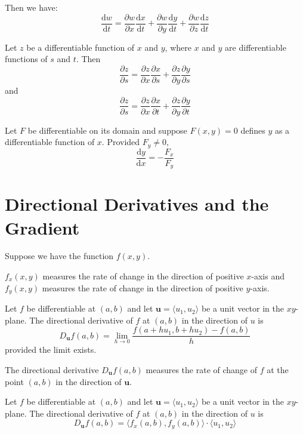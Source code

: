 \documentclass[../calc3.tex]{subfiles}
\begin{document}
Then we have:
\[\frac{\mathrm{d}w}{\mathrm{d}t}=\frac{\partial w}{\partial x}\frac{\mathrm{d}x}{\mathrm{d}t}+\frac{\partial w}{\partial y}\frac{\mathrm{d}y}{\mathrm{d}t}+\frac{\partial w}{\partial z}\frac{\mathrm{d}z}{\mathrm{d}t}\]

\begin{theorem}
    Let $z$ be a differentiable function of $x$ and $y$, where $x$ and $y$ are differentiable functions of $s$ and $t$. Then
    \[\frac{\partial z}{\partial s}=\frac{\partial z}{\partial x}\frac{\partial x}{\partial s}+\frac{\partial z}{\partial y}\frac{\partial y}{\partial s}\]
    and
    \[\frac{\partial z}{\partial s}=\frac{\partial z}{\partial x}\frac{\partial x}{\partial t}+\frac{\partial z}{\partial y}\frac{\partial y}{\partial t}\]
\end{theorem}

\begin{theorem}
    Let $F$ be differentiable on its domain and suppose $F(x,y) = 0$ defines $y$ as a 
    differentiable function of $x$. Provided $F_y\neq 0$,
    \[\frac{\mathrm{d}y}{\mathrm{d}x}=-\frac{F_x}{F_y}\]
\end{theorem}

\section{Directional Derivatives and the Gradient}
Suppose we have the function $f(x,y)$.

$f_x(x,y)$ measures the rate of change in the direction of positive $x$-axis and 
$f_y(x,y)$ measures the rate of change in the direction of positive $y$-axis.

\begin{definition}
    Let $f$ be differentiable at $(a,b)$ and let $\textbf{u}=\langle u_1, u_2\rangle$ be a unit vector 
    in the $xy$-plane. The directional derivative of $f$ at $(a,b)$ in the direction of $u$ is 
    \[D_{\textbf{u}}f(a,b)=\lim_{h\to 0}\frac{f(a+hu_1,b+hu_2)-f(a,b)}{h}\] 
    provided the limit exists.
\end{definition}

The directional derivative $D_{\textbf{u}}f(a,b)$ measures the rate of change of $f$ 
at the point $(a,b)$ in the direction of $\textbf{u}$.

\begin{theorem}
    Let $f$ be differentiable at $(a,b)$ and let $\textbf{u} = \langle u_1, u_2\rangle$ be a unit vector 
    in the $xy$-plane. The directional derivative of $f$ at $(a,b)$ in the direction of $u$ is 
    \[D_{\textbf{u}}f(a,b)=\langle f_x(a,b),f_y(a,b)\rangle\cdot \langle u_1,u_2\rangle\]
\end{theorem}
\end{document}

